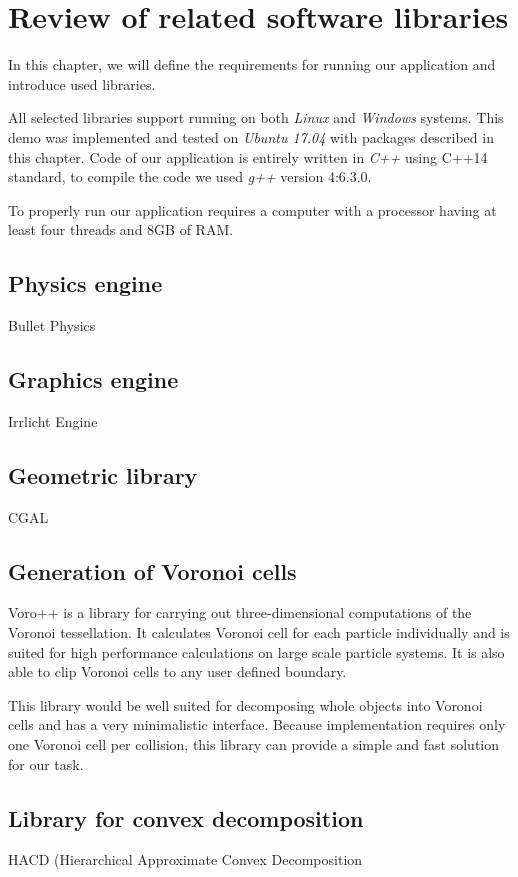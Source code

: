 \chapter{Review of related software libraries}
\label{chapt:technology}
In this chapter, we will define the requirements for running our application and introduce used libraries.

All selected libraries support running on both \emph{Linux} and \emph{Windows} systems. This demo was implemented and tested on \emph{Ubuntu 17.04} with packages described in this chapter. Code of our application is entirely written in \emph{C++} using C++14 standard, to compile the code we used \emph{g++} version 4:6.3.0.

To properly run our application requires a computer with a processor having at least four threads and 8GB of RAM.

\section{Physics engine}
Bullet Physics


\section{Graphics engine}
Irrlicht Engine

\section{Geometric library}
CGAL

\section{Generation of Voronoi cells}
Voro++ is a library for carrying out three-dimensional computations of the Voronoi tessellation. It calculates Voronoi cell for each particle individually and is suited for high performance calculations on large scale particle systems. It is also able to clip Voronoi cells to any user defined boundary.

This library would be well suited for decomposing whole objects into Voronoi cells and has a very minimalistic interface. Because implementation requires only one Voronoi cell per collision, this library can provide a simple and fast solution for our task.

\section{Library for convex decomposition}
\label{sec:decompositionLib}
HACD (Hierarchical Approximate Convex Decomposition
\cite{HACD}





